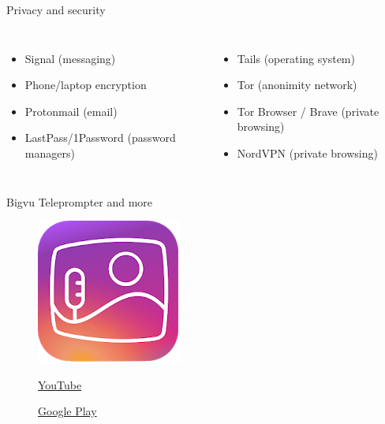\documentclass[serif,14pt,color=usenames,dvipsnames]{beamer}
\begin{document}
\begin{frame}{Privacy and security}
  \small
  \begin{columns}
    \begin{itemize}
      \item Signal (messaging)
      \item Phone/laptop encryption
      \item Protonmail (email)
      \item LastPass/1Password (password managers)
    \end{itemize}
    \begin{itemize}
      \item Tails (operating system)
      \item Tor (anonimity network)
      \item Tor Browser / Brave (private browsing)
      \item NordVPN (private browsing)
    \end{itemize}
  \end{columns}

\end{frame}

\begin{frame}{Bigvu}
  Teleprompter and more
  \begin{figure}
    \centering
  \includegraphics[width=0.3\linewidth]{imgs/bigvu}


  \href{https://www.youtube.com/watch?time_continue=2&v=-yqQnW5s70E}{YouTube }

  \href{https://play.google.com/store/apps/details?id=bigvu.com.reporter}{Google
  Play }
  \end{figure}
\end{frame}
\end{document}
